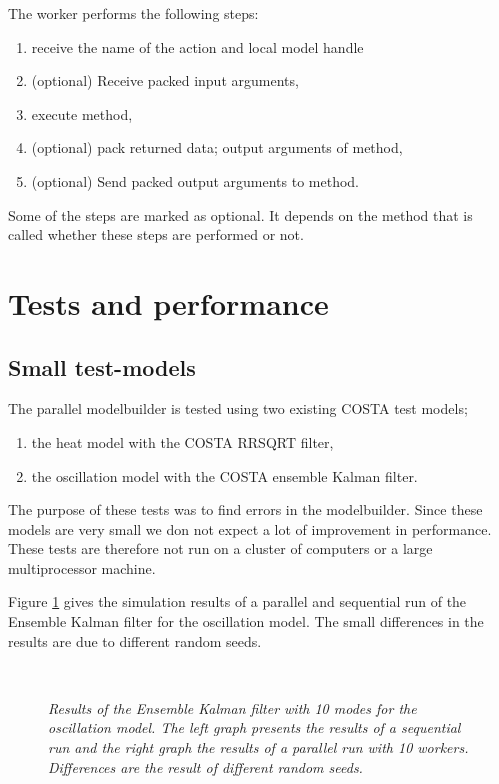 The worker performs the following steps:
\begin{enumerate}
\item receive the name of the action and local model handle
\item (optional) Receive packed input arguments,
\item execute method,
\item (optional) pack returned data; output arguments of method,
\item (optional) Send packed output arguments to method.
\end{enumerate}

Some of the steps are marked as optional. It depends on the method that is
called whether these steps are performed or not.



\section{Tests and performance}\label{Sec:Tests and Performance}
\subsection{Small test-models}
The parallel modelbuilder is tested using two existing COSTA test models; 
\begin{enumerate}
\item the heat model with the COSTA RRSQRT filter,
\item the oscillation model with the COSTA ensemble Kalman filter.
\end{enumerate}

The purpose of these tests was to find errors in the modelbuilder. Since
these models are very small we don not expect a lot of improvement in
performance. These tests are therefore not run on a cluster of computers or
a large multiprocessor machine.

Figure \ref{Fig:twee} gives the simulation results of a parallel and
sequential run of the Ensemble Kalman filter for the oscillation model. The
small differences in the results are due to different random seeds.

\begin{figure}
\hbox{
      }

\caption{\em Results of the Ensemble Kalman filter with 10 modes for the
             oscillation model. The left graph presents the results of a
             sequential run and the right graph the results of a parallel
             run with 10 workers. Differences are the result of different
             random seeds.}
\label{Fig:twee}
\end{figure}

